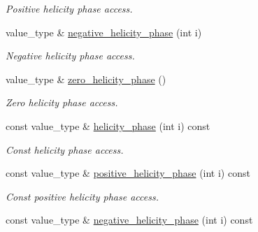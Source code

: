 \begin{DoxyCompactItemize}
\begin{DoxyCompactList}\small\item\em Positive helicity phase access. \end{DoxyCompactList}\item 
\hypertarget{a00271_a53728fd2d71a048b384e06b2b9b8a5e7}{value\-\_\-type \& \hyperlink{a00271_a53728fd2d71a048b384e06b2b9b8a5e7}{negative\-\_\-helicity\-\_\-phase} (int i)}\label{a00271_a53728fd2d71a048b384e06b2b9b8a5e7}

\begin{DoxyCompactList}\small\item\em Negative helicity phase access. \end{DoxyCompactList}\item 
\hypertarget{a00271_aa9365d9eca35c397b79e87bee4649ac2}{value\-\_\-type \& \hyperlink{a00271_aa9365d9eca35c397b79e87bee4649ac2}{zero\-\_\-helicity\-\_\-phase} ()}\label{a00271_aa9365d9eca35c397b79e87bee4649ac2}

\begin{DoxyCompactList}\small\item\em Zero helicity phase access. \end{DoxyCompactList}\item 
\hypertarget{a00271_aaaf246643011e27d709381d8cbf15aed}{const value\-\_\-type \& \hyperlink{a00271_aaaf246643011e27d709381d8cbf15aed}{helicity\-\_\-phase} (int i) const }\label{a00271_aaaf246643011e27d709381d8cbf15aed}

\begin{DoxyCompactList}\small\item\em Const helicity phase access. \end{DoxyCompactList}\item 
\hypertarget{a00271_a5e29c9516044c5482e057a0327da134f}{const value\-\_\-type \& \hyperlink{a00271_a5e29c9516044c5482e057a0327da134f}{positive\-\_\-helicity\-\_\-phase} (int i) const }\label{a00271_a5e29c9516044c5482e057a0327da134f}

\begin{DoxyCompactList}\small\item\em Const positive helicity phase access. \end{DoxyCompactList}\item 
\hypertarget{a00271_aa35fa9590cf61e931bb66260d7499a13}{const value\-\_\-type \& \hyperlink{a00271_aa35fa9590cf61e931bb66260d7499a13}{negative\-\_\-helicity\-\_\-phase} (int i) const }\label{a00271_aa35fa9590cf61e931bb66260d7499a13}


\end{DoxyCompactItemize}
